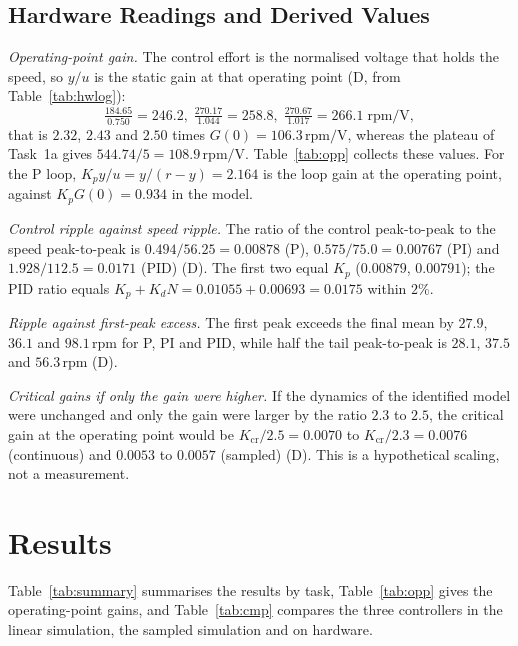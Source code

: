 \documentclass[lettersize,journal]{IEEEtran}
\newcommand{\Kcr}{K_{\mathrm{cr}}}
\newcommand{\rpm}{\,\text{rpm}}
\begin{document}
\subsection{Hardware Readings and Derived Values}
\label{sec:hwcalc}
\emph{Operating-point gain.} The control effort is the normalised voltage that holds the speed, so $y/u$ is the static gain at that operating point (D, from Table~\ref{tab:hwlog}):
\begin{equation}
\tfrac{184.65}{0.750}=246.2,\;
\tfrac{270.17}{1.044}=258.8,\;
\tfrac{270.67}{1.017}=266.1\;\text{rpm/V},
\end{equation}
that is $2.32$, $2.43$ and $2.50$ times $G(0)=106.3\rpm/\text{V}$, whereas the plateau of Task~1a gives $544.74/5=108.9\rpm/\text{V}$. Table~\ref{tab:opp} collects these values. For the P loop, $K_py/u=y/(r-y)=2.164$ is the loop gain at the operating point, against $K_pG(0)=0.934$ in the model.

\emph{Control ripple against speed ripple.} The ratio of the control peak-to-peak to the speed peak-to-peak is $0.494/56.25=0.00878$ (P), $0.575/75.0=0.00767$ (PI) and $1.928/112.5=0.0171$ (PID) (D). The first two equal $K_p$ ($0.00879$, $0.00791$); the PID ratio equals $K_p+K_dN=0.01055+0.00693=0.0175$ within $2\%$.

\emph{Ripple against first-peak excess.} The first peak exceeds the final mean by $27.9$, $36.1$ and $98.1\rpm$ for P, PI and PID, while half the tail peak-to-peak is $28.1$, $37.5$ and $56.3\rpm$ (D).

\emph{Critical gains if only the gain were higher.} If the dynamics of the identified model were unchanged and only the gain were larger by the ratio $2.3$ to $2.5$, the critical gain at the operating point would be $\Kcr/2.5=0.0070$ to $\Kcr/2.3=0.0076$ (continuous) and $0.0053$ to $0.0057$ (sampled) (D). This is a hypothetical scaling, not a measurement.

\section{Results}
Table~\ref{tab:summary} summarises the results by task, Table~\ref{tab:opp} gives the operating-point gains, and Table~\ref{tab:cmp} compares the three controllers in the linear simulation, the sampled simulation and on hardware.
\end{document}
